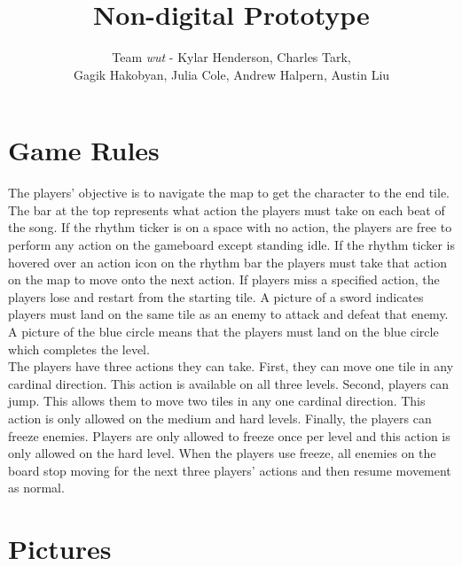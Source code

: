\documentclass[]{article}
\begin{document}
\title{Non-digital Prototype}
\author{Team \emph{wut} - Kylar Henderson, Charles Tark,\\ 
Gagik Hakobyan, Julia Cole, Andrew Halpern, Austin Liu}
\date{} %
\maketitle

\section*{Game Rules}

The players' objective is to navigate the map to get the character to
the end tile. The bar at the top represents what action the players
must take on each beat of the song. If the rhythm ticker is on a space
with no action, the players are free to perform any action on the
gameboard except standing idle. If the rhythm ticker is hovered over
an action icon on the rhythm bar the players must take that action on
the map to move onto the next action. If players miss a specified
action, the players lose and restart from the starting tile. A picture
of a sword indicates players must land on the same tile as an enemy to
attack and defeat that enemy. A picture of the blue circle means that
the players must land on the blue circle which completes the level.\\

The players have three actions they can take. First, they can move one
tile in any cardinal direction. This action is available on all three
levels. Second, players can jump. This allows them to move two tiles
in any one cardinal direction. This action is only allowed on the
medium and hard levels. Finally, the players can freeze
enemies. Players are only allowed to freeze once per level and this
action is only allowed on the hard level. When the players use freeze,
all enemies on the board stop moving for the next three players'
actions and then resume movement as normal.

\pagebreak
\section*{Pictures}
\end{document}
